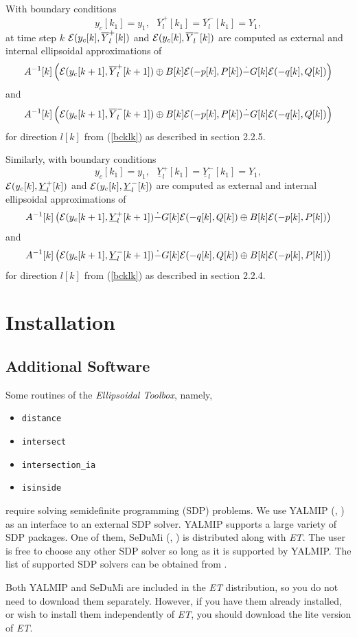 \documentclass{report}
\newcommand{\EE}{{\cal E}}
\begin{document}
With boundary conditions
\[ y_c[k_1]=y_1, ~~~ \overline{Y}_l^+[k_1] = \overline{Y}_l^-[k_1] = Y_1, \]
at time step $k$
$\EE(y_c[k],\overline{Y}_l^+[k])$ and $\EE(y_c[k],\overline{Y}_l^-[k])$
are computed as external and internal ellipsoidal approximations of
\[ A^{-1}[k]\left(\EE(y_c[k+1],\overline{Y}_l^+[k+1]) \oplus
B[k]\EE(-p[k],P[k]) \dot{-} G[k]\EE(-q[k],Q[k])\right) \]
and
\[ A^{-1}[k]\left(\EE(y_c[k+1],\overline{Y}_l^-[k+1]) \oplus
B[k]\EE(-p[k],P[k]) \dot{-} G[k]\EE(-q[k],Q[k])\right) \]
for direction $l[k]$ from (\ref{bcklk}) as described in section 2.2.5.

Similarly, with boundary conditions
\[ y_c[k_1]=y_1, ~~~ \underline{Y}_l^+[k_1] = \underline{Y}_l^-[k_1] = Y_1, \]
$\EE(y_c[k],\underline{Y}_l^+[k])$ and
$\EE(y_c[k],\underline{Y}_l^-[k])$ are computed as external and internal
ellipsoidal approximations of
\[ A^{-1}[k]\left(\EE(y_c[k+1],\underline{Y}_l^+[k+1]) \dot{-}
G[k]\EE(-q[k],Q[k]) \oplus B[k]\EE(-p[k],P[k])\right) \]
and
\[ A^{-1}[k]\left(\EE(y_c[k+1],\underline{Y}_l^-[k+1]) \dot{-}
G[k]\EE(-q[k],Q[k]) \oplus B[k]\EE(-p[k],P[k])\right) \]
for direction $l[k]$ from (\ref{bcklk}) as described in section 2.2.4.





\chapter{Installation}
\section{Additional Software}
Some routines of the {\it Ellipsoidal Toolbox}, namely,
\begin{itemize}
\item {\tt distance}
\item {\tt intersect}
\item {\tt intersection\_ia}
\item {\tt isinside}
\end{itemize}
require solving semidefinite programming (SDP) problems.
We use YALMIP (\cite{yalmip}, \cite{yalmiphp}) as an
interface to an external SDP solver. YALMIP supports a large variety of SDP
packages. One of them, SeDuMi (\cite{sedumi}, \cite{sedumihp}) is distributed
along with {\it ET}. The user is free to choose any other SDP solver so long
as it is supported by YALMIP. The list of supported SDP solvers can be
obtained from \cite{yalmiphp}.

Both YALMIP and SeDuMi are included in the {\it ET} distribution, so you
do not need to download them separately. However, if you have them already
installed, or wish to install them independently of {\it ET}, you should
download the lite version of {\it ET}.
\end{document}
